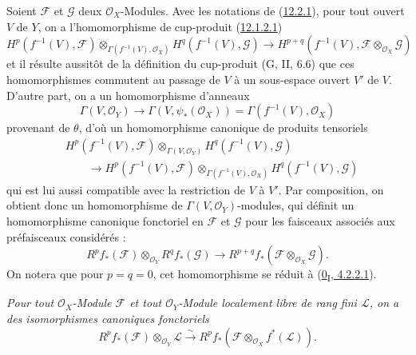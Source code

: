 \begin{env}[12.2.2]
\label{0.12.2.2-fr}
Soient $\mathcal F$ et $\mathcal G$ deux $\mathcal O_X$-Modules. Avec les
notations de (\hyperref[0.12.2.1-fr]{12.2.1}), pour tout ouvert $V$ de $Y$,
on a l'homomorphisme de cup-produit
(\hyperref[0.12.1.2.1-fr]{12.1.2.1})
\[
H^p(f^{-1}(V),\mathcal F)
\otimes_{\Gamma(f^{-1}(V),\mathcal O_X)}
H^q(f^{-1}(V),\mathcal G)
\longrightarrow
H^{p+q}(f^{-1}(V),\mathcal F\otimes_{\mathcal O_X}\mathcal G)
\]
et il résulte aussitôt de la définition du cup-produit (G, II, 6.6) que ces
homomorphismes commutent au passage de $V$ à un sous-espace ouvert $V'$ de
$V$. D'autre part, on a un homomorphisme d'anneaux
\[
\Gamma(V,\mathcal O_Y)\longrightarrow\Gamma(V,\psi_*(\mathcal O_X))
=\Gamma(f^{-1}(V),\mathcal O_X)
\]
provenant de $\theta$, d'où un homomorphisme canonique de produits tensoriels
\[
\begin{aligned}
&H^p(f^{-1}(V),\mathcal F)\otimes_{\Gamma(V,\mathcal O_Y)}
H^q(f^{-1}(V),\mathcal G)\\
&\qquad\longrightarrow
H^p(f^{-1}(V),\mathcal F)
\otimes_{\Gamma(f^{-1}(V),\mathcal O_X)}
H^q(f^{-1}(V),\mathcal G)
\end{aligned}
\]
qui est lui aussi compatible avec la restriction de $V$ à $V'$. Par
composition, on obtient donc un homomorphisme de
$\Gamma(V,\mathcal O_Y)$-modules, qui définit un homomorphisme canonique
fonctoriel en $\mathcal F$ et $\mathcal G$ pour les faisceaux associés aux
préfaisceaux considérés :
\[
\label{0.12.2.2.1-fr}
\tag{12.2.2.1}
R^p f_*(\mathcal F)\otimes_{\mathcal O_Y}R^q f_*(\mathcal G)
\longrightarrow
R^{p+q}f_*(\mathcal F\otimes_{\mathcal O_X}\mathcal G).
\]
On notera que pour $p=q=0$, cet homomorphisme se réduit à
(\hyperref[0.4.2.2.1-fr]{0\textsubscript{I}, 4.2.2.1}).
\end{env}

\begin{proposition}[12.2.3]
\label{0.12.2.3-fr}
\emph{Pour tout $\mathcal O_X$-Module $\mathcal F$ et tout
$\mathcal O_Y$-Module localement libre de rang fini $\mathcal L$, on a des
isomorphismes canoniques fonctoriels
\[
\label{0.12.2.3.1-fr}
\tag{12.2.3.1}
R^p f_*(\mathcal F)\otimes_{\mathcal O_Y}\mathcal L
\xrightarrow{\sim}
R^p f_*(\mathcal F\otimes_{\mathcal O_X}f^*(\mathcal L)).
\]}
\end{proposition}

